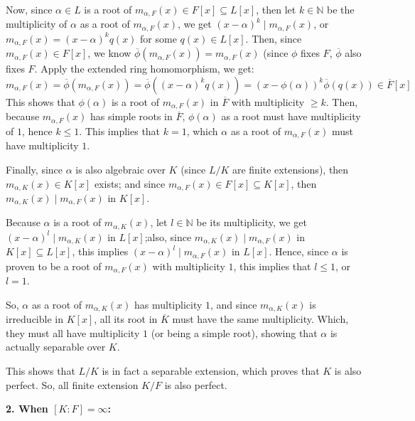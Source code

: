 \documentclass{article}
\begin{document}
Now, since $\alpha\in L$ is a root of $m_{\alpha,F}(x)\in F[x]\subseteq L[x]$, then let $k\in\mathbb{N}$ be the multiplicity of $\alpha$ as a root of $m_{\alpha,F}(x)$, we get $(x-\alpha)^k\mid m_{\alpha,F}(x)$, or $m_{\alpha,F}(x)=(x-\alpha)^kq(x)$ for some $q(x)\in L[x]$. Then, since $m_{\alpha,F}(x)\in F[x]$, we know $\overline{\phi}(m_{\alpha,F}(x)) = m_{\alpha,F}(x)$ (since $\phi$ fixes $F$, $\overline{\phi}$ also fixes $F$. Apply the extended ring homomorphism, we get:
$$m_{\alpha,F}(x)=\overline{\phi}(m_{\alpha,F}(x))=\overline{\phi}((x-\alpha)^kq(x)) = (x-\phi(\alpha))^k\overline{\phi}(q(x))\in \overline{F}[x]$$
This shows that $\phi(\alpha)$ is a root of $m_{\alpha,F}(x)$ in $\overline{F}$ with multiplicity $\geq k$. Then, because $m_{\alpha,F}(x)$ has simple roots in $\overline{F}$, $\phi(\alpha)$ as a root must have multiplicity of $1$, hence $k\leq 1$. This implies that $k=1$, which $\alpha$ as a root of $m_{\alpha,F}(x)$ must have multiplicity $1$.

\hfil

Finally, since $\alpha$ is also algebraic over $K$ (since $L/K$ are finite extensions), then $m_{\alpha, K}(x)\in K[x]$ exists; and since $m_{\alpha,F}(x)\in F[x]\subseteq K[x]$, then $m_{\alpha,K}(x)\mid m_{\alpha,F}(x)$ in $K[x]$.

Because $\alpha$ is a root of $m_{\alpha,K}(x)$, let $l\in \mathbb{N}$ be its multiplicity, we get $(x-\alpha)^l\mid m_{\alpha,K}(x)$ in $L[x]$;also, since $m_{\alpha,K}(x)\mid m_{\alpha,F}(x)$ in $K[x]\subseteq L[x]$, this implies $(x-\alpha)^l\mid m_{\alpha,F}(x)$ in $L[x]$. Hence, since $\alpha$ is proven to be a root of $m_{\alpha,F}(x)$ with multiplicity $1$, this implies that $l\leq 1$, or $l=1$.

So, $\alpha$ as a root of $m_{\alpha,K}(x)$ has multiplicity $1$, and since $m_{\alpha,K}(x)$ is irreducible in $K[x]$, all its root in $\overline{K}$ must have the same multiplicity. Which, they must all have multiplicity $1$ (or being a simple root), showing that $\alpha$ is actually separable over $K$.

This shows that $L/K$ is in fact a separable extension, which proves that $K$ is also perfect. So, all finite extension $K/F$ is also perfect.

\hfil

\textbf{2. When $[K:F]=\infty$:}

\break
\end{document}
